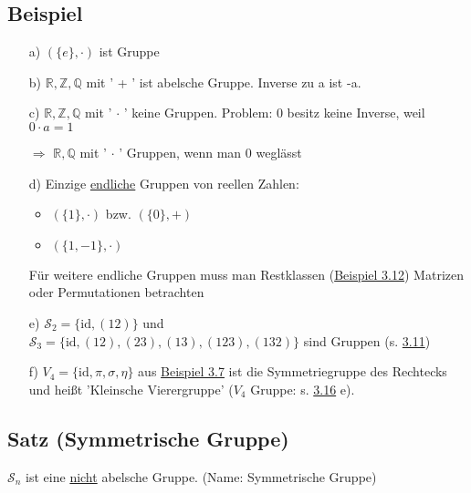 \documentclass[a4paper, 12pt,titlepage, pdf, headsepline]{scrartcl}
\newcommand{\R}{\mathds{R}}
\newcommand{\uline}[1]{\underline{#1}}
\newcommand{\id}{\textrm{id}}
\renewcommand{\>}{\rightarrow}
\renewcommand{\*}{\cdot}
\begin{document}
	      \subsection{Beispiel}
	      \label{3.10}
	      \begin{itemize}
	      	\item[a)] $(\{e\}, \cdot )$ ist Gruppe
	      	\item[b)] $\R, \mathds{Z}, \mathds{Q}$ mit ' + ' ist abelsche Gruppe. Inverse zu a ist -a.
	      	\item[c)] $\R, \mathds{Z}, \mathds{Q}$ mit ' $\cdot$ ' keine Gruppen. Problem: 0 besitz keine Inverse, weil \\
	      	      $0 \cdot a = 1$\Lightning
	      	\item[$\Rightarrow$]  $\R, \mathds{Q}$ mit ' $\cdot$ ' Gruppen, wenn man 0 weglässt
	      	\item[d)] Einzige \uline{endliche} Gruppen von reellen Zahlen: 
	      	      \begin{itemize}
	      	      	\item $(\{1\}, \cdot )$ bzw. $(\{0\}, + )$
	      	      	\item $(\{1,-1\}, \cdot)$
	      	      \end{itemize}
	      	      Für weitere endliche Gruppen muss man Restklassen (\hyperref[3.12]{Beispiel 3.12}) Matrizen oder Permutationen betrachten
	      	\item[e)] $\mathscr{S}_2 = \{\id, (12)\}$ und \\
	      	      $\mathscr{S}_3 = \{\id, (12), (23),(13),(123),(132)\}$ sind Gruppen (s. \hyperref[3.11]{3.11})
	      	\item[f)] $V_4 = \{\id, \pi, \sigma, \eta \}$ aus \hyperref[3.7]{Beispiel 3.7} ist die Symmetriegruppe des Rechtecks und heißt 'Kleinsche Vierergruppe' ($V_4$ Gruppe: s. \hyperref[3.16]{3.16} e).
	      \end{itemize}
	      \subsection{Satz (Symmetrische Gruppe)}
	      \label{3.11}
	      $\mathscr{S}_n$ ist eine \uline{nicht} abelsche Gruppe. (Name: Symmetrische Gruppe) \\
\end{document}
